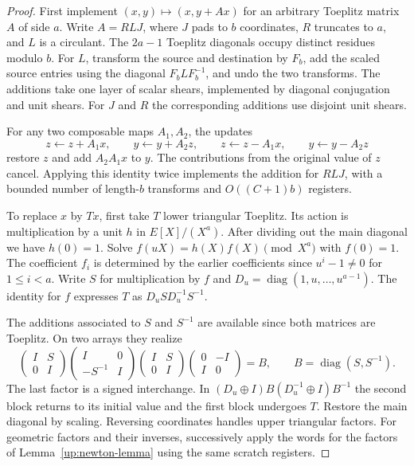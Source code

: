 \begin{proof}
First implement \((x,y)\mapsto(x,y+Ax)\) for an arbitrary Toeplitz
matrix \(A\) of side \(a\). Write \(A=RLJ\), where \(J\) pads to \(b\)
coordinates, \(R\) truncates to \(a\), and \(L\) is a circulant.
The \(2a-1\) Toeplitz diagonals occupy distinct residues modulo \(b\).
For \(L\), transform the source and destination by \(F_b\), add the
scaled source entries using the diagonal \(F_b L F_b^{-1}\), and undo
the two transforms. The additions take one layer of scalar shears,
implemented by diagonal conjugation and unit shears. For \(J\) and
\(R\) the corresponding additions use disjoint unit shears.

For any two composable maps \(A_1,A_2\), the updates
\[
 z\gets z+A_1x,\qquad y\gets y+A_2z,\qquad
 z\gets z-A_1x,\qquad y\gets y-A_2z
\]
restore \(z\) and add \(A_2A_1x\) to \(y\). The contributions from the
original value of \(z\) cancel. Applying this identity twice implements
the addition for \(RLJ\), with a bounded number of length-\(b\)
transforms and \(O((C+1)b)\) registers.

To replace \(x\) by \(Tx\), first take \(T\) lower triangular Toeplitz.
Its action is multiplication by a unit \(h\) in \(E[X]/(X^a)\).
After dividing out the main diagonal we have \(h(0)=1\). Solve
\(f(uX)=h(X)f(X)\pmod{X^a}\) with \(f(0)=1\). The coefficient \(f_i\)
is determined by the earlier coefficients since \(u^i-1\ne0\) for
\(1\le i<a\). Write \(S\) for multiplication by \(f\) and
\(D_u=\operatorname{diag}(1,u,\ldots,u^{a-1})\). The identity for \(f\)
expresses \(T\) as \(D_u S D_u^{-1}S^{-1}\).

The additions associated to \(S\) and \(S^{-1}\) are available since
both matrices are Toeplitz. On two arrays they realize
\[
 \begin{pmatrix}I&S\\0&I\end{pmatrix}
 \begin{pmatrix}I&0\\-S^{-1}&I\end{pmatrix}
 \begin{pmatrix}I&S\\0&I\end{pmatrix}
 \begin{pmatrix}0&-I\\I&0\end{pmatrix}
  = B,\qquad B=\operatorname{diag}(S,S^{-1}).
\]
The last factor is a signed interchange. In
\((D_u\oplus I)B(D_u^{-1}\oplus I)B^{-1}\) the second block returns to
its initial value and the first block undergoes \(T\). Restore the main
diagonal by scaling. Reversing coordinates handles upper triangular
factors. For geometric factors and their inverses, successively apply
the words for the factors of Lemma~\ref{up:newton-lemma} using the same
scratch registers.
\end{proof}

